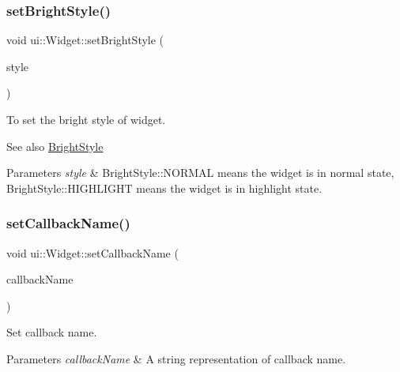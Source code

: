 \subsubsection{\texorpdfstring{set\+Bright\+Style()}{setBrightStyle()}\hspace{0.1cm}{\footnotesize\ttfamily [2/2]}}
{\footnotesize\ttfamily void ui\+::\+Widget\+::set\+Bright\+Style (\begin{DoxyParamCaption}\item[{\hyperlink{classui_1_1Widget_a4040e89d49e005b771ac8a80a13206fc}{Bright\+Style}}]{style }\end{DoxyParamCaption})}

To set the bright style of widget.

\begin{DoxySeeAlso}{See also}
\hyperlink{classui_1_1Widget_a4040e89d49e005b771ac8a80a13206fc}{Bright\+Style}
\end{DoxySeeAlso}

\begin{DoxyParams}{Parameters}
{\em style} & Bright\+Style\+::\+N\+O\+R\+M\+AL means the widget is in normal state, Bright\+Style\+::\+H\+I\+G\+H\+L\+I\+G\+HT means the widget is in highlight state. \\
\hline
\end{DoxyParams}
\mbox{\label{classui_1_1Widget_a9055626a00d49c171b008fc8424f3774}} 
\subsubsection{\texorpdfstring{set\+Callback\+Name()}{setCallbackName()}\hspace{0.1cm}{\footnotesize\ttfamily [1/2]}}
{\footnotesize\ttfamily void ui\+::\+Widget\+::set\+Callback\+Name (\begin{DoxyParamCaption}\item[{const std\+::string \&}]{callback\+Name }\end{DoxyParamCaption})\hspace{0.3cm}{\ttfamily [inline]}}

Set callback name. 
\begin{DoxyParams}{Parameters}
{\em callback\+Name} & A string representation of callback name. \\
\hline
\end{DoxyParams}
\mbox{\label{classui_1_1Widget_a9055626a00d49c171b008fc8424f3774}} 
